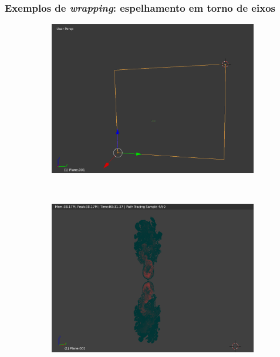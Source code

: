 \documentclass{beamer}
\begin{document}
\begin{frame}

\frametitle{Exemplos de \emph{wrapping}: espelhamento em torno de eixos}

\begin{figure}[!htb]
        \centering
        \begin{subfigure}{0.3\textwidth}
                \includegraphics[width=\textwidth]{transf_geometry}
        \end{subfigure}%
        ~ %
        \begin{subfigure}{0.3\textwidth}
                \includegraphics[width=\textwidth]{transf_upsideDown}  

\end{subfigure}
\end{figure}
\end{frame}
\end{document}
